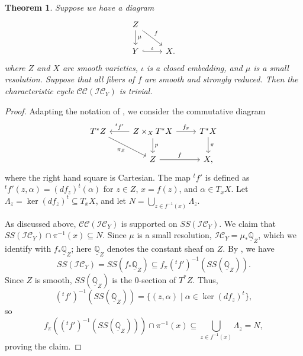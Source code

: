 \documentclass[11pt,letterpaper,reqno]{amsart}
\newcommand{\cC}{\mathcal C}
\newcommand{\cI}{\mathcal I}
\newcommand{\IC}{\cI \cC}
\newcommand{\CC}{\cC \cC}
\numberwithin{equation}{section}
\theoremstyle{plain}
\newtheorem{theorem}{Theorem}[section]
\theoremstyle{definition}
\theoremstyle{remark}
\begin{document}
\begin{theorem} \label{t:char-cycle}
Suppose we have a diagram \[ 
\begin{tikzcd}
Z \arrow[d,"\mu"]\arrow[dr,"f"]&\\
Y\arrow[r,"\iota",hook]&X.
\end{tikzcd}
\]
where $Z$ and $X$ are smooth varieties, $\iota$ is a closed embedding, and $\mu$ is a small resolution. 
Suppose that all fibers of $f$ are smooth and strongly reduced.  
Then the characteristic cycle $\CC(\mathcal{IC}_Y)$ is trivial.
\end{theorem}

\begin{proof}
Adapting the notation of \cite[(4.3.2)]{KS}, we consider the commutative diagram 
\begin{equation}
\begin{tikzcd}
T^* Z  \arrow[rd,"\pi_Z"'] & \arrow[l,"^{t}f' "']Z\times_X T^* X \arrow[d,"p"]\arrow[r,"f_{\pi} "]&T^* X\arrow[d,"\pi"]\\
& Z\arrow[r,"f"]&X,
\end{tikzcd}
\end{equation}
where the right hand square is Cartesian.  The map $^t f'$ is defined as $^t f'(z, \alpha) = (df_z)^t (\alpha)$ for
$z \in Z$, $x = f(z)$, and $\alpha \in T_x X$.  Let $\Lambda_z = \ker (df_z)^t \subseteq T_x X$, and let $N = \bigcup_{z \in f^{-1}(x)} \Lambda_z$.

As discussed above,  $\CC(\mathcal{IC}_Y)$ is supported on $SS(\IC_Y)$.
We claim that $SS(\IC_Y) \cap \pi^{-1}(x) \subseteq N$.
Since $\mu$ is a small resolution, $\IC_Y = \mu_* \underline{\mathbb{Q}}_Z$, which we identify with $f_*  \underline{\mathbb{Q}}_Z$;
here $ \underline{\mathbb{Q}}_Z$ denotes the constant sheaf on $Z$.
By \cite[Prop.~5.4.4]{KS}, we have
\begin{equation} \label{e:KS}
SS(\IC_Y) = SS(f_* \underline{\mathbb{Q}}_Z) \subseteq f_{\pi} (^{t}f') ^{-1} (SS( \underline{\mathbb{Q}}_Z) ).
\end{equation}
Since $Z$ is smooth, $SS( \underline{\mathbb{Q}}_Z)$ is the $0$-section of $T^*Z$.  Thus,
$$
(^{t}f') ^{-1} (SS( \underline{\mathbb{Q}}_Z) ) = \{ (z, \alpha) \mid \alpha \in \ker (df_z)^t \},
$$
so
$$
f_{\pi} ( (^{t}f') ^{-1} (SS( \underline{\mathbb{Q}}_Z) ) )  \cap \pi^{-1}(x) \subseteq  \bigcup_{z \in f^{-1}(x)} \Lambda_z = N,
$$
proving the claim.


\end{proof}
\end{document}
